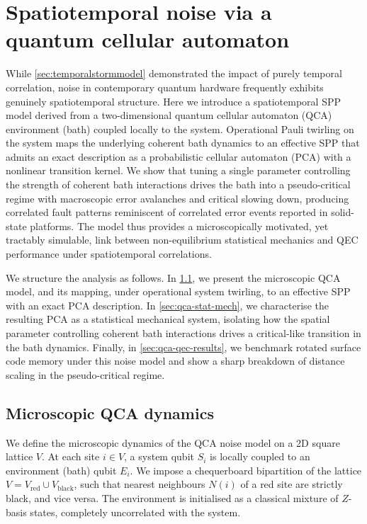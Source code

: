 \section{Spatiotemporal noise via a quantum cellular automaton}\label{sec:qcamodel}
While \cref{sec:temporalstormmodel} demonstrated the impact of purely temporal correlation, noise in contemporary quantum hardware frequently exhibits genuinely spatiotemporal structure. Here we introduce a spatiotemporal SPP model derived from a two-dimensional quantum cellular automaton (QCA) environment (bath) coupled locally to the system. Operational Pauli twirling on the system maps the underlying coherent bath dynamics to an effective SPP that admits an exact description as a probabilistic cellular automaton (PCA) with a nonlinear transition kernel. We show that tuning a single parameter controlling the strength of coherent bath interactions drives the bath into a pseudo-critical regime with macroscopic error avalanches and critical slowing down, producing correlated fault patterns reminiscent of correlated error events reported in solid-state platforms. The model thus provides a microscopically motivated, yet tractably simulable, link between non-equilibrium statistical mechanics and QEC performance under spatiotemporal correlations.

We structure the analysis as follows. In \cref{sec:qca-details}, we present the microscopic QCA model, and its mapping, under operational system twirling, to an effective SPP with an exact PCA description. In \cref{sec:qca-stat-mech}, we characterise the resulting PCA as a statistical mechanical system, isolating how the spatial parameter controlling coherent bath interactions drives a critical-like transition in the bath dynamics. Finally, in \cref{sec:qca-qec-results}, we benchmark rotated surface code memory under this noise model and show a sharp breakdown of distance scaling in the pseudo-critical regime.

\subsection{Microscopic QCA dynamics}\label{sec:qca-details}
We define the microscopic dynamics of the QCA noise model on a 2D square lattice \(V\). At each site \(i\in V\), a system qubit \(S_i\) is locally coupled to an environment (bath) qubit \(E_i\). We impose a chequerboard bipartition of the lattice \(V = V_\mathrm{red} \cup V_\mathrm{black}\), such that nearest neighbours \(N(i)\) of a red site are strictly black, and vice versa. The environment is initialised as a classical mixture of \(Z\)-basis states, completely uncorrelated with the system.

